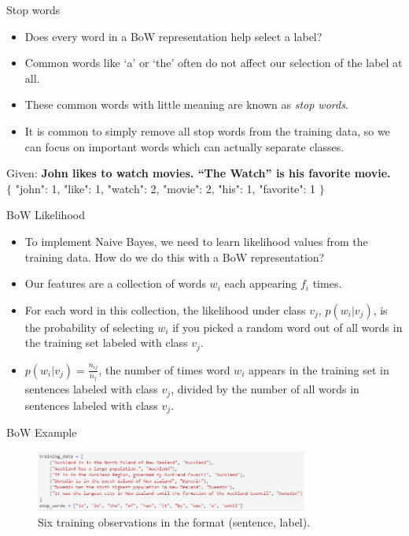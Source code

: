 \documentclass[aspectratio=169, 10pt]{beamer}
\begin{document}
\begin{frame}{Stop words}
    \begin{itemize}
        \item Does every word in a BoW representation help select a label?
        \item Common words like `a' or `the' often do not affect our selection of the label at all.
        \item These common words with little meaning are known as \textit{stop words}.
        \item It is common to simply remove all stop words from the training data, so we can focus on important words which can actually separate classes.
    \end{itemize}

    \pause
    \vspace{1em}
    Given: \textbf{John likes to watch movies. ``The Watch'' is his favorite movie.} \\
    $\{$ "john": 1, "like": 1, "watch": 2, "movie": 2, "his": 1, "favorite": 1 $\}$
\end{frame}

\begin{frame}{BoW Likelihood}
    \begin{itemize}
        \item To implement Naive Bayes, we need to learn likelihood values from the training data. How do we do this with a BoW representation?
        \item Our features are a collection of words $w_i$ each  appearing $f_i$ times.
        \item For each word in this collection, the likelihood under class $v_j$, $p(w_i|v_j)$, is the probability of  selecting $w_i$ if you picked a random word out of all words in the training set labeled with class $v_j$.
        \item $p(w_i|v_j) = \frac{n_{ij}}{n_j}$, the number of times word $w_i$ appears in the training set in sentences labeled with class $v_j$, divided by the number of all words in sentences labeled with class $v_j$.
    \end{itemize}
    \end{frame}

\begin{frame}{BoW Example}
    \begin{figure}
        \centering
        \includegraphics[width=0.8\textwidth]{../imgs/sentence_example.png}
        \caption{Six training observations in the format (sentence, label).}
    \end{figure}
\end{frame}
\end{document}
